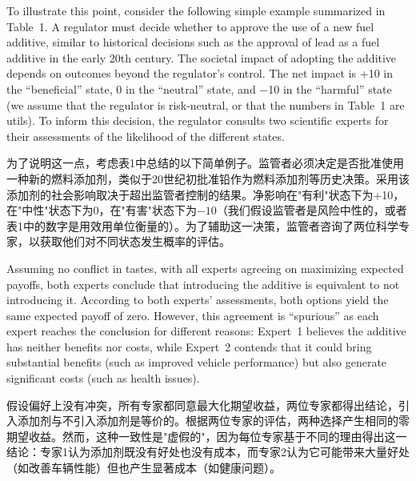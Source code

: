\documentclass[12pt,a4paper]{article}
\newenvironment{original}
  {\par\noindent\ignorespaces}
  {\par}
\newenvironment{translation}
  {\par\noindent{\color{transblue}\ignorespaces}}
  {\par\medskip}
\begin{document}
\begin{original}
To illustrate this point, consider the following simple example summarized in Table~1. A regulator must decide whether to approve the use of a new fuel additive, similar to historical decisions such as the approval of lead as a fuel additive in the early 20th century. The societal impact of adopting the additive depends on outcomes beyond the regulator's control. The net impact is +10 in the ``beneficial'' state, 0 in the ``neutral'' state, and $-$10 in the ``harmful'' state (we assume that the regulator is risk-neutral, or that the numbers in Table~1 are utils). To inform this decision, the regulator consults two scientific experts for their assessments of the likelihood of the different states.
\end{original}

\begin{translation}
为了说明这一点，考虑表1中总结的以下简单例子。监管者必须决定是否批准使用一种新的燃料添加剂，类似于20世纪初批准铅作为燃料添加剂等历史决策。采用该添加剂的社会影响取决于超出监管者控制的结果。净影响在"有利"状态下为+10，在"中性"状态下为0，在"有害"状态下为$-10$（我们假设监管者是风险中性的，或者表1中的数字是用效用单位衡量的）。为了辅助这一决策，监管者咨询了两位科学专家，以获取他们对不同状态发生概率的评估。
\end{translation}

\begin{original}
Assuming no conflict in tastes, with all experts agreeing on maximizing expected payoffs, both experts conclude that introducing the additive is equivalent to not introducing it. According to both experts' assessments, both options yield the same expected payoff of zero. However, this agreement is ``spurious'' as each expert reaches the conclusion for different reasons: Expert~1 believes the additive has neither benefits nor costs, while Expert~2 contends that it could bring substantial benefits (such as improved vehicle performance) but also generate significant costs (such as health issues).
\end{original}

\begin{translation}
假设偏好上没有冲突，所有专家都同意最大化期望收益，两位专家都得出结论，引入添加剂与不引入添加剂是等价的。根据两位专家的评估，两种选择产生相同的零期望收益。然而，这种一致性是"虚假的"，因为每位专家基于不同的理由得出这一结论：专家1认为添加剂既没有好处也没有成本，而专家2认为它可能带来大量好处（如改善车辆性能）但也产生显著成本（如健康问题）。
\end{translation}
\end{document}
